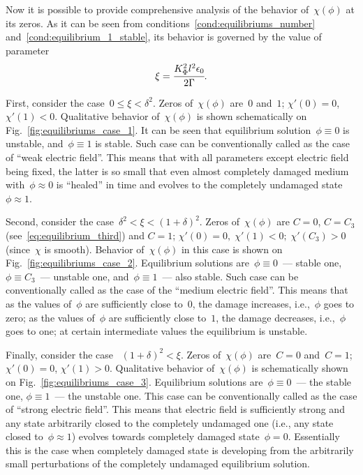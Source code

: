 Now it is possible to provide comprehensive analysis of the behavior
of~$\chi(\phi)$ at its zeros. As it can be seen from conditions~\eqref{cond:equilibriums_number} and~\eqref{cond:equilibrium_1_stable},
its behavior is governed by the value of parameter
\begin{equation}
  \xi = \cfrac{K_\Phi^2 l^2 \epsilon_0}{2 \Gamma} {\text{.}}
  \label{char:equilibriums}
\end{equation}

First, consider the case~$0 \leqslant \xi < \delta^2$. Zeros
of~$\chi(\phi)$ are~$0$ and~$1$; $\chi'(0) = 0$, $\chi'(1) < 0$.
Qualitative behavior of~$\chi(\phi)$ is shown schematically on
Fig.~\ref{fig:equilibriums_case_1}.  It can be seen that equilibrium
solution~$\phi \equiv 0$ is unstable, and~$\phi \equiv 1$ is stable.
Such case can be conventionally called as the case of ``weak electric field''.
This means that with all parameters except electric field being fixed,
the latter is so small that even almost completely damaged
medium with~$\phi \approx 0$ is ``healed'' in time and evolves to the
completely undamaged state~$\phi \approx 1$.

Second, consider the case~$\delta^2 < \xi < (1 + \delta)^2$.
Zeros of~$\chi(\phi)$ are $C=0$, $C=C_3$
(see~\eqref{eq:equilibrium_third}) and $C=1$; $\chi'(0) = 0, \;
\chi'(1) < 0; \; \chi'(C_3) > 0$
(since~$\chi$ is smooth).
Behavior of~$\chi(\phi)$ in this case is shown on
Fig.~\ref{fig:equilibriums_case_2}.
Equilibrium solutions are~$\phi \equiv 0$~--- stable one, $\phi
\equiv C_3$~--- unstable one, and~$\phi \equiv 1$~--- also stable.
Such case can be conventionally called as the case of the ``medium
electric field''.
This means that as the values of~$\phi$ are sufficiently close to~$0$,
the damage increases, i.e.,~$\phi$ goes to zero;
as the values of~$\phi$ are sufficiently close to~$1$,
the damage decreases, i.e.,~$\phi$ goes to one;
at certain intermediate values the equilibrium is unstable.

Finally, consider the case~ $(1 + \delta)^2 < \xi$.
Zeros of~$\chi(\phi)$ are~$C=0$ and~$C=1$; $\chi'(0) = 0$, $\chi'(1)>0$.
Qualitative behavior of~$\chi(\phi)$ is schematically shown on
Fig.~\ref{fig:equilibriums_case_3}.
Equilibrium solutions are~$\phi \equiv 0$~--- the stable one, $\phi
\equiv 1$~--- the unstable one.
This case can be conventionally called as the case of ``strong
electric field''.
This means that electric field is sufficiently strong and
any state arbitrarily closed to the completely undamaged one
(i.e., any state closed to~$\phi \approx 1$) evolves towards
completely damaged state~$\phi= 0$.
Essentially this is the case when completely damaged state is
developing
from the arbitrarily small perturbations of the completely undamaged
equilibrium solution.

